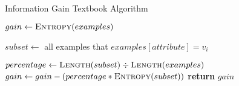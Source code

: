 \begin{algorithm}[H]
\caption{Information Gain Textbook Algorithm}\label{a:id3-gain-simple}
\begin{algorithmic}[1]
    \State $gain \gets \textsc{Entropy}(examples)$

        \State $subset \gets$ all examples that $examples[attribute] = v_i$

        \State $percentage \gets \textsc{Length}(subset) \div \textsc{Length}(examples)$
            \State $gain \gets gain - (percentage * \textsc{Entropy}(subset))$
        \EndIf
    \EndFor
    \State \textbf{return} $gain$
\EndProcedure
\end{algorithmic}
\end{algorithm}
